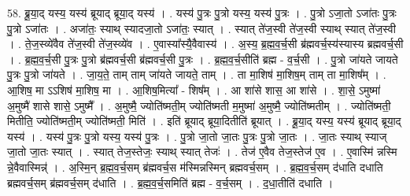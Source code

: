 \documentclass[17pt]{extarticle}
\begin{document}
58. ब्रू॒या॒द् यस्य॒ यस्य॑ ब्रूयाद् ब्रूया॒द् यस्य॑ । . यस्य॑ पु॒त्रः पु॒त्रो यस्य॒ यस्य॑ पु॒त्रः । . पु॒त्रो ऽजा॒तो ऽजा॑तः पु॒त्रः पु॒त्रो ऽजा॑तः । . अजा॑तः॒ स्याथ् स्यादजा॒तो ऽजा॑तः॒ स्यात् । . स्यात् ते॑ज॒स्वी ते॑ज॒स्वी स्याथ् स्यात् ते॑ज॒स्वी । . ते॒ज॒स्व्ये॑वैव ते॑ज॒स्वी ते॑ज॒स्व्ये॑व । . ए॒वास्या᳚स्यै॒वैवास्य॑ । . अ॒स्य॒ ब्र॒ह्म॒व॒र्च॒सी ब्र॑ह्मवर्च॒स्य॑स्यास्य ब्रह्मवर्च॒सी । . ब्र॒ह्म॒व॒र्च॒सी पु॒त्रः पु॒त्रो ब्र॑ह्मवर्च॒सी ब्र॑ह्मवर्च॒सी पु॒त्रः । . ब्र॒ह्म॒व॒र्च॒सीति॑ ब्रह्म - व॒र्च॒सी । . पु॒त्रो जा॑यते जायते पु॒त्रः पु॒त्रो जा॑यते । . जा॒य॒ते॒ ताम् ताम् जा॑यते जायते॒ ताम् । . ता मा॒शिष॑ मा॒शिष॒म् ताम् ता मा॒शिष᳚म् । . आ॒शिष॒ मा ऽऽशिष॑ मा॒शिष॒ मा । . आ॒शिष॒मित्या᳚ - शिष᳚म् । . आ शा॑से शास॒ आ शा॑से । . शा॒से॒ ऽमुष्मा॑ अ॒मुष्मै॑ शासे शासे॒ ऽमुष्मै᳚ । . अ॒मुष्मै॒ ज्योति॑ष्मती॒म् ज्योति॑ष्मती म॒मुष्मा॑ अ॒मुष्मै॒ ज्योति॑ष्मतीम् । . ज्योति॑ष्मती॒ मितीति॒ ज्योति॑ष्मती॒म् ज्योति॑ष्मती॒ मिति॑ । . इति॑ ब्रूयाद् ब्रूया॒दितीति॑ ब्रूयात् । . ब्रू॒या॒द् यस्य॒ यस्य॑ ब्रूयाद् ब्रूया॒द् यस्य॑ । . यस्य॑ पु॒त्रः पु॒त्रो यस्य॒ यस्य॑ पु॒त्रः । . पु॒त्रो जा॒तो जा॒तः पु॒त्रः पु॒त्रो जा॒तः । . जा॒तः स्याथ् स्याज् जा॒तो जा॒तः स्यात् । . स्यात् तेज॒स्तेजः॒ स्याथ् स्यात् तेजः॑ । . तेज॑ ए॒वैव तेज॒स्तेज॑ ए॒व । . ए॒वास्मि॑ न्नस्मि न्ने॒वैवास्मिन्न्॑ । . अ॒स्मि॒न् ब्र॒ह्म॒व॒र्च॒सम् ब्र॑ह्मवर्च॒स म॑स्मिन्नस्मिन् ब्रह्मवर्च॒सम् । . ब्र॒ह्म॒व॒र्च॒सम् द॑धाति दधाति ब्रह्मवर्च॒सम् ब्र॑ह्मवर्च॒सम् द॑धाति । . ब्र॒ह्म॒व॒र्च॒समिति॑ ब्रह्म - व॒र्च॒सम् । . द॒धा॒तीति॑ दधाति । \newline
\end{document}
